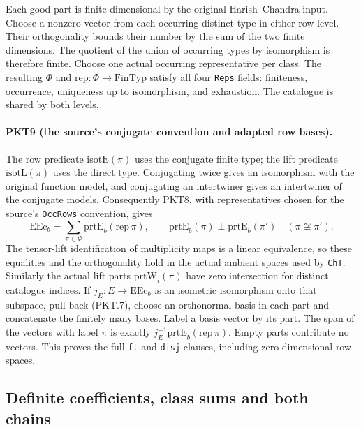 Each good part is finite dimensional by the original Harish--Chandra input.
Choose a nonzero vector from each occurring distinct type in either row
level.  Their orthogonality bounds their number by the sum of the two finite
dimensions.  The quotient of the union of occurring types by isomorphism
is therefore finite.  Choose one actual occurring representative per class.
The resulting $\Phi$ and $\mathrm{rep}:\Phi\to\mathrm{FinTyp}$ satisfy
all four \texttt{Reps} fields: finiteness, occurrence, uniqueness up to
isomorphism, and exhaustion.  The catalogue is shared by both levels.

\paragraph{PKT9 (the source's conjugate convention and adapted row bases).}\label{claim:PKT9}
The row predicate $\mathrm{isotE}(\pi)$ uses the conjugate finite type;
the lift predicate $\mathrm{isotL}(\pi)$ uses the direct type.  Conjugating
twice gives an isomorphism with the original function model, and conjugating
an intertwiner gives an intertwiner of the conjugate models.  Consequently
PKT8, with representatives chosen for the source's \texttt{OccRows}
convention, gives
\[
 \mathrm{EEc}_b=\sum_{\pi\in\Phi}\mathrm{prtE}_b(\mathrm{rep}\,\pi),
 \qquad
 \mathrm{prtE}_b(\pi)\perp\mathrm{prtE}_b(\pi')\quad(\pi\not\cong\pi').
 \tag{PKT.7}
\]
The tensor-lift identification of multiplicity maps is a linear equivalence,
so these equalities and the orthogonality hold in the actual ambient spaces
used by \texttt{ChT}.  Similarly the actual lift parts
$\mathrm{prtW}_i(\pi)$ have zero intersection for distinct catalogue indices.
If $j_E:E\to\mathrm{EEc}_b$ is an isometric isomorphism onto that subspace,
pull back (PKT.7), choose an orthonormal basis in each part and concatenate
the finitely many bases.  Label a basis vector by its part.  The span of the
vectors with label $\pi$ is exactly $j_E^{-1}\mathrm{prtE}_b(\mathrm{rep}\,\pi)$.
Empty parts contribute no vectors.  This proves the full \texttt{ft} and
\texttt{disj} clauses, including zero-dimensional row spaces.

\subsection{Definite coefficients, class sums and both chains}

